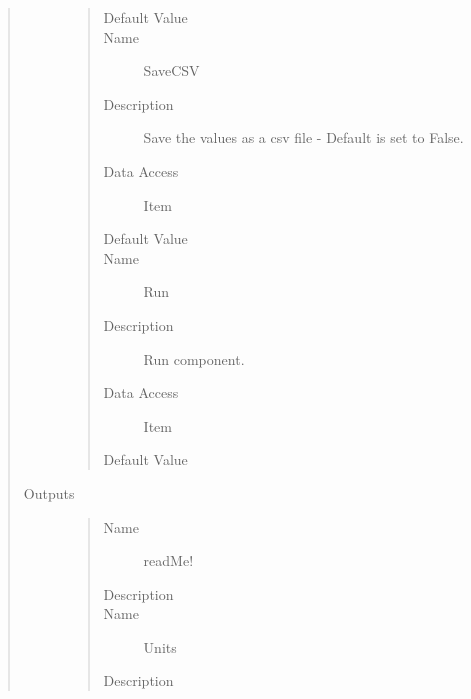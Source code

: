 \documentclass[letterpaper,10pt,english]{sphinxmanual}
\begin{document}
\begin{quote}
\begin{description}
\begin{quote}
\begin{description}
\item[{Default Value}] \leavevmode
{}

\item[{Name}] \leavevmode
SaveCSV

\item[{Description}] \leavevmode
Save the values as a csv file - Default is set to False.

\item[{Data Access}] \leavevmode
Item

\item[{Default Value}] \leavevmode
{}

\item[{Name}] \leavevmode
Run

\item[{Description}] \leavevmode
Run component.

\item[{Data Access}] \leavevmode
Item

\item[{Default Value}] \leavevmode
{}

\end{description}\end{quote}

\item[{Outputs}] \leavevmode\begin{quote}\begin{description}
\item[{Name}] \leavevmode
readMe!

\item[{Description}] \leavevmode
{}

\item[{Name}] \leavevmode
Units

\item[{Description}] \leavevmode
{}


\end{description}
\end{quote}
\end{description}
\end{quote}
\end{document}
